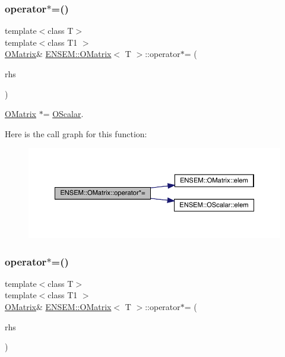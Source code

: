 \subsubsection{\texorpdfstring{operator$\ast$=()}{operator*=()}\hspace{0.1cm}{\footnotesize\ttfamily [1/2]}}
{\footnotesize\ttfamily template$<$class T$>$ \\
template$<$class T1 $>$ \\
\mbox{\hyperlink{classENSEM_1_1OMatrix}{O\+Matrix}}\& \mbox{\hyperlink{classENSEM_1_1OMatrix}{E\+N\+S\+E\+M\+::\+O\+Matrix}}$<$ T $>$\+::operator$\ast$= (\begin{DoxyParamCaption}\item[{const \mbox{\hyperlink{classENSEM_1_1OScalar}{O\+Scalar}}$<$ T1 $>$ \&}]{rhs }\end{DoxyParamCaption})\hspace{0.3cm}{\ttfamily [inline]}}



\mbox{\hyperlink{classENSEM_1_1OMatrix}{O\+Matrix}} $\ast$= \mbox{\hyperlink{classENSEM_1_1OScalar}{O\+Scalar}}. 

Here is the call graph for this function\+:
\nopagebreak
\begin{figure}[H]
\begin{center}
\leavevmode
\includegraphics[width=350pt]{dd/d80/classENSEM_1_1OMatrix_a40e18b83c9eb609f7529e65c515010c2_cgraph}
\end{center}
\end{figure}
\mbox{\label{classENSEM_1_1OMatrix_a40e18b83c9eb609f7529e65c515010c2}} 
\subsubsection{\texorpdfstring{operator$\ast$=()}{operator*=()}\hspace{0.1cm}{\footnotesize\ttfamily [2/2]}}
{\footnotesize\ttfamily template$<$class T$>$ \\
template$<$class T1 $>$ \\
\mbox{\hyperlink{classENSEM_1_1OMatrix}{O\+Matrix}}\& \mbox{\hyperlink{classENSEM_1_1OMatrix}{E\+N\+S\+E\+M\+::\+O\+Matrix}}$<$ T $>$\+::operator$\ast$= (\begin{DoxyParamCaption}\item[{const \mbox{\hyperlink{classENSEM_1_1OScalar}{O\+Scalar}}$<$ T1 $>$ \&}]{rhs }\end{DoxyParamCaption})\hspace{0.3cm}{\ttfamily [inline]}}



